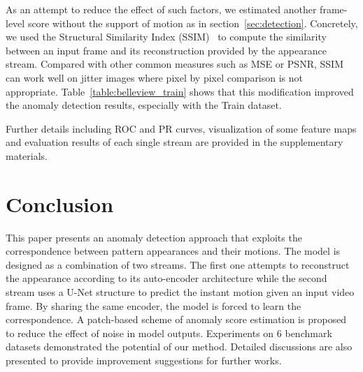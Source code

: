 \documentclass[10pt,twocolumn,letterpaper]{article}
\begin{document}
As an attempt to reduce the effect of such factors, we estimated another frame-level score without the support of motion as in section~\ref{sec:detection}. Concretely, we used the Structural Similarity Index (SSIM)~\cite{Wang2004Image} to compute the similarity between an input frame and its reconstruction provided by the appearance stream. Compared with other common measures such as MSE or PSNR, SSIM can work well on jitter images where pixel by pixel comparison is not appropriate. Table~\ref{table:belleview_train} shows that this modification improved the anomaly detection results, especially with the Train dataset.

Further details including ROC and PR curves, visualization of some feature maps and evaluation results of each single stream are provided in the supplementary materials.

\section{Conclusion}\label{sec:conclusion}
This paper presents an anomaly detection approach that exploits the correspondence between pattern appearances and their motions. The model is designed as a combination of two streams. The first one attempts to reconstruct the appearance according to its auto-encoder architecture while the second stream uses a U-Net structure to predict the instant motion given an input video frame. By sharing the same encoder, the model is forced to learn the correspondence. A patch-based scheme of anomaly score estimation is proposed to reduce the effect of noise in model outputs. Experiments on 6 benchmark datasets demonstrated the potential of our method. Detailed discussions are also presented to provide improvement suggestions for further works.

{\small


}
\end{document}
